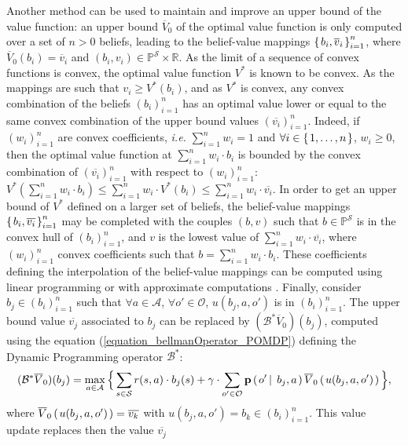 Another method can be used to maintain and improve an upper bound 
of the value function: 
an upper bound $\overline{V}_0$ of the optimal value function is only
computed over a set of $n>0$ beliefs,
leading to the belief-value mappings 
$\left\{ \left.  b_i, \overline{v}_i  \right. \right\}_{i=1}^{n}$,
where $\overline{V}_0(b_i) = \overline{v}_i$
and $(b_i,v_i) \in \mathbb{P}^{\mathcal{S}} \times \mathbb{R}$.
As the limit of a sequence of convex functions
is convex, the optimal value function $V^*$ is known to be convex.
As the mappings are such that $v_i \geqslant V^*(b_i)$, 
and as $V^*$ is convex, any convex combination of the beliefs $(b_i)_{i=1}^n$
has an optimal value lower or equal to the same convex combination of the upper bound values $(\overline{v_i})_{i=1}^n$.
Indeed, if $(w_i)_{i=1}^n$ are convex coefficients, \textit{i.e.} 
$\sum_{i=1}^n w_i = 1$ and $\forall i \in \left\{ \left. 1,\ldots,n \right. \right\}$, $w_i\geqslant 0$,
then the optimal value function at $\sum_{i=1}^n w_i \cdot b_i$ 
is bounded by the convex combination of $(\overline{v_i})_{i=1}^n$
with respect to $(w_i)_{i=1}^n$: $V^*(\sum_{i=1}^n w_i \cdot b_i) \leqslant \sum_{i=1}^n w_i \cdot V^*(b_i) \leqslant \sum_{i=1}^n w_i \cdot \overline{v_i}$.
In order to get an upper bound of $V^*$ defined on a larger set of beliefs, 
the belief-value mappings $\left\{ \left.  b_i, \overline{v_i}  \right. \right\}_{i=1}^n$
may be completed with the couples $(b,v)$ such that
$b \in \mathbb{P}^{\mathcal{S}}$ is in the convex hull of $(b_i)_{i=1}^{n}$,
and $v$ is the lowest value of $\sum_{i=1}^n w_i \cdot \overline{v_i}$,
where $(w_i)_{i=1}^n$ convex coefficients such that $b = \sum_{i=1}^n w_i \cdot b_i$.
These coefficients defining the interpolation of the belief-value mappings 
can be computed using linear programming
or with approximate computations 
\cite{DBLP:journals/corr/abs-1106-0234,conf/aips/PoupartKK11}.
Finally, consider $b_j \in (b_i)_{i=1}^n$ 
such that $\forall a \in \mathcal{A}$, $\forall o' \in \mathcal{O}$,
$u(b_j,a,o')$ is in $(b_i)_{i=1}^n$.
The upper bound value $\overline{v_j}$ associated to $b_j$ can be replaced by 
$(\mathcal{B}^* \overline{V}_0)(b_j)$, computed using the equation (\ref{equation_bellmanOperator_POMDP}) defining the Dynamic Programming operator $\mathcal{B}^*$:
\[ (\mathcal{B}^* \overline{V}_0)(b_j) = \max_{a \in \mathcal{A}} \Big\{ \sum_{s \in \mathcal{S}} r(s,a) \cdot b_j(s) + \gamma \cdot \sum_{o' \in \mathcal{O}} \textbf{p} \left( \left. o' \, \right| \left. \, b_j , a  \right. \right) \overline{V}_0 \left( \left.  u(b_j,a,o')   \right. \right) \Big\}, \]
where $\overline{V}_0 \left( \left.  u(b_j,a,o')   \right. \right) = \overline{v_k}$
with $u(b_j,a,o') = b_k \in (b_i)_{i=1}^n$.
This value update replaces then the value $\overline{v_j}$
